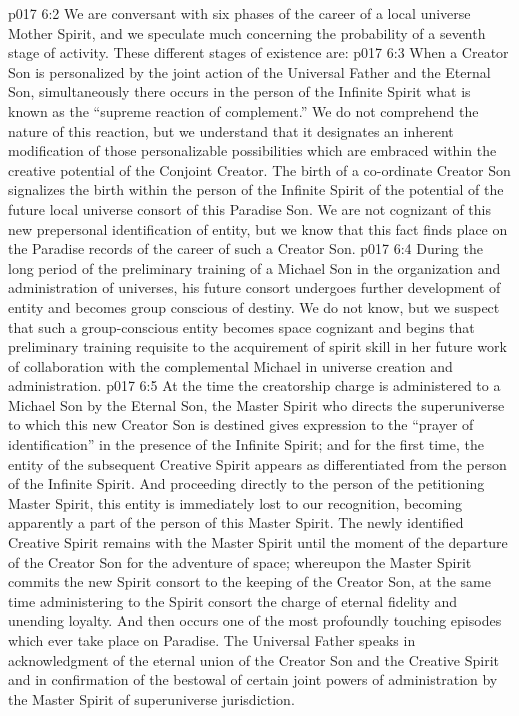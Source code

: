 \pc \vs p017 6:2 We are conversant with six phases of the career of a local universe Mother Spirit, and we speculate much concerning the probability of a seventh stage of activity. These different stages of existence are:
\pc \vs p017 6:3 \bibnobreakspace {} When a Creator Son is personalized by the joint action of the Universal Father and the Eternal Son, simultaneously there occurs in the person of the Infinite Spirit what is known as the “supreme reaction of complement.” We do not comprehend the nature of this reaction, but we understand that it designates an inherent modification of those personalizable possibilities which are embraced within the creative potential of the Conjoint Creator. The birth of a co\hyp{}ordinate Creator Son signalizes the birth within the person of the Infinite Spirit of the potential of the future local universe consort of this Paradise Son. We are not cognizant of this new prepersonal identification of entity, but we know that this fact finds place on the Paradise records of the career of such a Creator Son.
\pc \vs p017 6:4 \bibnobreakspace {} During the long period of the preliminary training of a Michael Son in the organization and administration of universes, his future consort undergoes further development of entity and becomes group conscious of destiny. We do not know, but we suspect that such a group\hyp{}conscious entity becomes space cognizant and begins that preliminary training requisite to the acquirement of spirit skill in her future work of collaboration with the complemental Michael in universe creation and administration.
\pc \vs p017 6:5 \bibnobreakspace {} At the time the creatorship charge is administered to a Michael Son by the Eternal Son, the Master Spirit who directs the superuniverse to which this new Creator Son is destined gives expression to the “prayer of identification” in the presence of the Infinite Spirit; and for the first time, the entity of the subsequent Creative Spirit appears as differentiated from the person of the Infinite Spirit. And proceeding directly to the person of the petitioning Master Spirit, this entity is immediately lost to our recognition, becoming apparently a part of the person of this Master Spirit. The newly identified Creative Spirit remains with the Master Spirit until the moment of the departure of the Creator Son for the adventure of space; whereupon the Master Spirit commits the new Spirit consort to the keeping of the Creator Son, at the same time administering to the Spirit consort the charge of eternal fidelity and unending loyalty. And then occurs one of the most profoundly touching episodes which ever take place on Paradise. The Universal Father speaks in acknowledgment of the eternal union of the Creator Son and the Creative Spirit and in confirmation of the bestowal of certain joint powers of administration by the Master Spirit of superuniverse jurisdiction.
